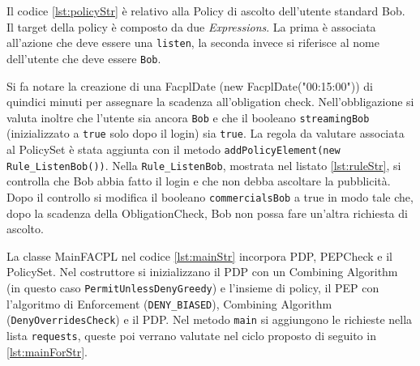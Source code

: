 Il codice \ref{lst:policyStr} è relativo alla Policy di ascolto dell'utente standard Bob.
Il target della policy è composto da due \emph{Expressions}. La prima è associata all'azione che deve essere una \texttt{listen},
la seconda invece si riferisce al nome dell'utente che deve essere \texttt{Bob}.\par
Si fa notare la creazione di una FacplDate (new FacplDate("00:15:00")) di quindici minuti per assegnare la scadenza all'obligation check.
Nell'obbligazione si valuta inoltre che l'utente sia ancora \texttt{Bob} e che il booleano
\texttt{streamingBob} (inizializzato a \texttt{true} solo dopo il login) sia \texttt{true}.
La regola da valutare associata al PolicySet è stata aggiunta con il metodo
\texttt{addPolicyElement(new Rule\_ListenBob())}.
Nella \texttt{Rule\_ListenBob}, mostrata nel listato \ref{lst:ruleStr}, si controlla che Bob abbia fatto il login e che
non debba ascoltare la pubblicità. Dopo il controllo si modifica il booleano \texttt{commercialsBob} a true in modo tale
che, dopo la scadenza della ObligationCheck, Bob non possa fare un'altra richiesta di ascolto.

La classe MainFACPL nel codice \ref{lst:mainStr} incorpora PDP, PEPCheck e il PolicySet. Nel costruttore si inizializzano
il PDP con un Combining Algorithm (in questo caso \texttt{PermitUnlessDenyGreedy}) e l'insieme di policy, il PEP con l'algoritmo di
Enforcement (\texttt{DENY\_BIASED}), Combining Algorithm (\texttt{DenyOverridesCheck}) e il PDP.
Nel metodo \texttt{main} si aggiungono le richieste nella lista \texttt{requests}, queste poi verrano
valutate nel ciclo proposto di seguito in \ref{lst:mainForStr}.

